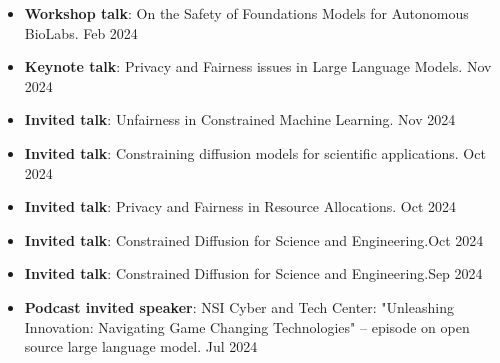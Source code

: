 
\vspace{6pt}
\begin{itemize}
  \item {\bf Workshop talk}: On the Safety of Foundations Models for Autonomous BioLabs.
  \hfill {Feb 2024}\\

  \item {\bf Keynote talk}: Privacy and Fairness issues in Large Language Models.
  \hfill {Nov 2024}\\

  \item {\bf Invited talk}: Unfairness in Constrained Machine Learning.
  \hfill {Nov 2024}\\

  \item {\bf Invited talk}: Constraining diffusion models for scientific applications.
  \hfill {Oct 2024}\\

  \item {\bf Invited talk}: Privacy and Fairness in Resource Allocations. \hfill{Oct 2024}\\

  \item {\bf Invited talk}: Constrained Diffusion for Science and Engineering.\hfill {Oct 2024}\\

  \item {\bf Invited talk}: Constrained Diffusion for Science and Engineering.\hfill {Sep 2024}\\

  \item {\bf Podcast invited speaker}: 
  NSI Cyber and Tech Center: "Unleashing Innovation: Navigating Game Changing Technologies" -- episode on open source large language model.
  \hfill{Jul 2024}\\


\end{itemize}
